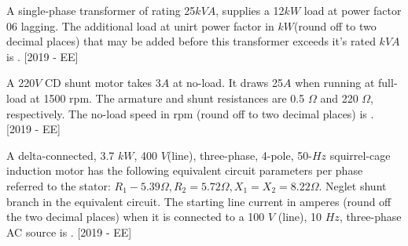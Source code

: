         \begin{center}
            
        \end{center}
\item A single-phase transformer of rating 25$kVA$, supplies a 12$kW$ load at power factor 06 lagging. The additional load at unirt power factor in $kW$(round off to two decimal places) that may be added before this transformer exceeds it's rated $kVA$ is \underline{\hspace{3cm}}. \hfill{[2019 - EE]}
\item A 220$V$ CD shunt motor takes 3$A$ at no-load. It draws 25$A$ when running at full-load at 1500 rpm. The armature and shunt resistances are 0.5 $\Omega$ and 220 $\Omega$, respectively. The no-load speed in rpm (round off to two decimal places) is \underline{\hspace{3cm}}. \hfill{[2019 - EE]}
\item A delta-connected, 3.7 $kW$, 400 $V$(line), three-phase, 4-pole, 50-$Hz$ squirrel-cage induction motor has the following equivalent circuit parameters per phase referred to the stator: $R_1 - 5.39 \Omega, R_2 = 5.72 \Omega, X_1 = X_2 = 8.22 \Omega$. Neglet shunt branch in the equivalent circuit. The starting line current in amperes (round off the two decimal places) when it is connected to a 100 $V$ (line), 10 $Hz$, three-phase AC source is \underline{\hspace{3cm}}. \hfill{[2019 - EE]}


